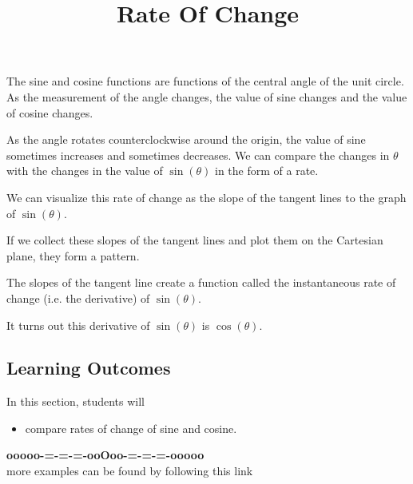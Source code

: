 \documentclass{ximera}
\title{Rate Of Change}
\begin{document}
\begin{abstract}
%
\end{abstract}
\maketitle




The sine and cosine functions are functions of the central angle of the unit circle.  As the measurement of the angle changes, the value of sine changes and the value of cosine changes.  


As the angle rotates counterclockwise around the origin, the value of sine sometimes increases and sometimes decreases.  We can compare the changes in $\theta$ with the changes in the value of $\sin(\theta)$ in the form of a rate. 

We can visualize this rate of change as the slope of the tangent lines to the graph of $\sin(\theta)$.

If we collect these slopes of the tangent lines and plot them on the Cartesian plane, they form a pattern.


The slopes of the tangent line create a function called the instantaneous rate of change (i.e. the derivative) of $\sin(\theta)$.

It turns out this derivative of $\sin(\theta)$ is $\cos(\theta)$.












\subsection*{Learning Outcomes}

\begin{sectionOutcomes}
In this section, students will 

\begin{itemize}
\item compare rates of change of sine and cosine.
\end{itemize}
\end{sectionOutcomes}








\begin{center}
\textbf{\textcolor{green!50!black}{ooooo-=-=-=-ooOoo-=-=-=-ooooo}} \\

more examples can be found by following this link\\ 

\end{center}
\end{document}
